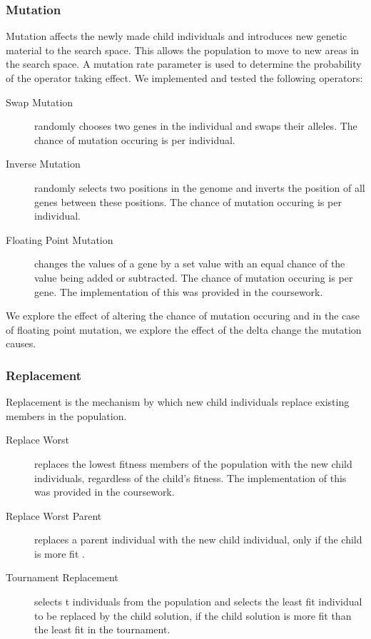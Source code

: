 \documentclass[sigconf]{acmart}
\begin{document}
\subsubsection{Mutation}
Mutation affects the newly made child individuals and introduces new genetic material to the search space. This allows the population to move to new areas in the search space. A mutation rate parameter is used to determine the probability of the operator taking effect.  We implemented and tested the following operators:
\begin{description}
\item[Swap Mutation] randomly chooses two genes in the individual and swaps their alleles. The chance of mutation occuring is per individual.\cite{Mutation}
\item[Inverse Mutation] randomly selects two positions in the genome and inverts the position of all genes between these positions. The chance of mutation occuring is per individual. \cite{Mutation}
\item[Floating Point Mutation] changes the values of a gene by a set value with an equal chance of the value being added or subtracted. The chance of mutation occuring is per gene. The implementation of this was provided in the coursework.
\end{description}

We explore the effect of altering the chance of mutation occuring and in the case of floating point mutation, we explore the effect of the delta change the mutation causes.

\subsubsection{Replacement}
Replacement is the mechanism by which new child individuals replace existing members in the population.
\begin{description}
\item[Replace Worst] replaces the lowest fitness members of the population with the new child individuals, regardless of the child's fitness. The implementation of this was provided in the coursework.
\item[Replace Worst Parent] replaces a parent individual with the new child individual, only if the child is more fit \cite{replacement}.
\item[Tournament Replacement] selects t individuals from the population and selects the least fit individual to be replaced by the child solution, if the child solution is more fit than the least fit in the tournament.

\end{description}
\end{document}
